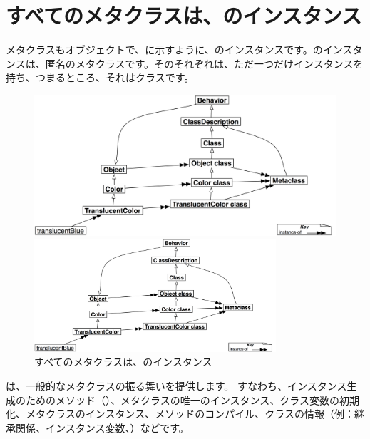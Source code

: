 \documentclass[a4paper,10pt,twoside]{book}
\begin{document}
\section{すべてのメタクラスは、のインスタンス}

メタクラスもオブジェクトで、に示すように、のインスタンスです。のインスタンスは、匿名のメタクラスです。そのそれぞれは、ただ一つだけインスタンスを持ち、つまるところ、それはクラスです。

\begin{center}
\begin{figure}
\ifluluelse
	{\centerline{\includegraphics[width=\textwidth]{TranslucentMetaclassClass}}}
	{\centerline{\includegraphics[width=0.8\textwidth]{TranslucentMetaclassClass}}}
\caption{すべてのメタクラスは、のインスタンス}
\end{figure}
\end{center}

は、一般的なメタクラスの振る舞いを提供します。
すなわち、インスタンス生成のためのメソッド（）、メタクラスの唯一のインスタンス、クラス変数の初期化、メタクラスのインスタンス、メソッドのコンパイル、クラスの情報（例：継承関係、インスタンス変数、\etc）などです。
\end{document}
